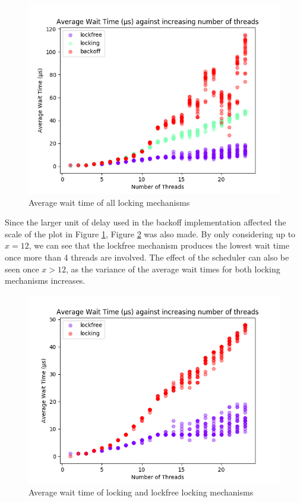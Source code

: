 \documentclass[12pt]{article}
\begin{document}
\begin{figure}[!h]
\centering
  \centering
	\includegraphics[width=0.8\linewidth]{images/mergedAverageWait}
	\caption{Average wait time of all locking mechanisms}
	\label{fig:mergedavgwait}
\end{figure}

Since the larger unit of delay used in the backoff implementation affected the scale of the plot in Figure \ref{fig:mergedavgwait}, Figure \ref{fig:omittedavgwait} was also made. By only considering up to $x = 12$, we can see that the lockfree mechanism produces the lowest wait time once more than 4 threads are involved. The effect of the scheduler can also be seen once $x > 12$, as the variance of the average wait times for both locking mechanisms increases. 

\begin{figure}[!h]
  \centering
  \includegraphics[width=0.8\linewidth]{images/omittedAverageWait}
	\caption{Average wait time of locking and lockfree locking mechanisms}
  \label{fig:omittedavgwait}
\end{figure}
\end{document}
